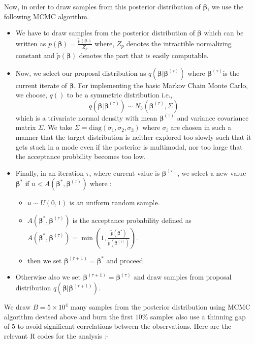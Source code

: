 \documentclass[11pt,english]{article}\usepackage[]{graphicx}\usepackage[]{xcolor}
\begin{document}
Now, in order to draw samples from this posterior distribution of
$\boldsymbol{\beta}$, we use the following MCMC algorithm.
\begin{itemize}
\item We have to draw samples from the posterior distribution of $\boldsymbol{\beta}$
which can be written as $p\left(\boldsymbol{\beta}\right)=\frac{\widetilde{p}\left(\boldsymbol{\beta}\right)}{Z_{p}}$
where, $Z_{p}$ denotes the intractible normalizing constant and $\widetilde{p}\left(\boldsymbol{\beta}\right)$
denotes the part that is easily computable.
\item Now, we select our proposal distribution as $q\left(\boldsymbol{\beta}|\boldsymbol{\beta}^{\left(\tau\right)}\right)$
where $\boldsymbol{\beta}^{\left(\tau\right)}$is the current iterate
of $\boldsymbol{\beta}$. For implementing the basic Markov Chain
Monte Carlo, we choose, $q\left(\right)$ to be a symmetric distribution
i.e., 
\[
q\left(\boldsymbol{\beta}|\boldsymbol{\beta}^{\left(\tau\right)}\right)\sim N_{3}\left(\boldsymbol{\beta}^{\left(\tau\right)},\Sigma\right)
\]
 which is a trivariate normal density with mean $\boldsymbol{\beta}^{\left(\tau\right)}$
and variance covariance matrix $\Sigma$. We take $\Sigma=\text{diag}\left(\sigma_{1},\sigma_{2},\sigma_{3}\right)$
where $\sigma_{i}$ are chosen in such a manner that the target distribution
is neither explored too slowly such that it gets stuck in a mode even
if the posterior is multimodal, nor too large that the acceptance
probbility becomes too low.
\item Finally, in an iteration $\tau$, where current value is $\boldsymbol{\beta}^{\left(\tau\right)}$,
we select a new value $\boldsymbol{\beta}^{*}$ if $u<A\left(\boldsymbol{\beta}^{*},\boldsymbol{\beta}^{\left(\tau\right)}\right)$
where : 
\begin{itemize}
\item $u\sim U\left(0,1\right)$ is an uniform random sample.
\item $A\left(\boldsymbol{\beta}^{*},\boldsymbol{\beta}^{\left(\tau\right)}\right)$
is the acceptance probability defined as $A\left(\boldsymbol{\beta}^{*},\boldsymbol{\beta}^{\left(\tau\right)}\right)=\min\left(1,\frac{\widetilde{p}\left(\boldsymbol{\beta}^{*}\right)}{\widetilde{p}\left(\boldsymbol{\beta}^{\left(\tau\right)}\right)}\right)$. 
\item then we set $\boldsymbol{\beta}^{\left(\tau+1\right)}=\boldsymbol{\beta}^{*}$
and proceed.
\end{itemize}
\item Otherwise also we set $\boldsymbol{\beta}^{\left(\tau+1\right)}=\boldsymbol{\beta}^{\left(\tau\right)}$
and draw samples from proposal distribution $q\left(\boldsymbol{\beta}|\boldsymbol{\beta}^{\left(\tau+1\right)}\right)$.
\end{itemize}
We draw $B=5\times10^{4}$ many samples from the posterior distribution
using MCMC algorithm devised above and burn the first $10\%$ samples
also use a thinning gap of $5$ to avoid significant correlations
between the observations. Here are the relevant R codes for the analysis
:-
\end{document}
